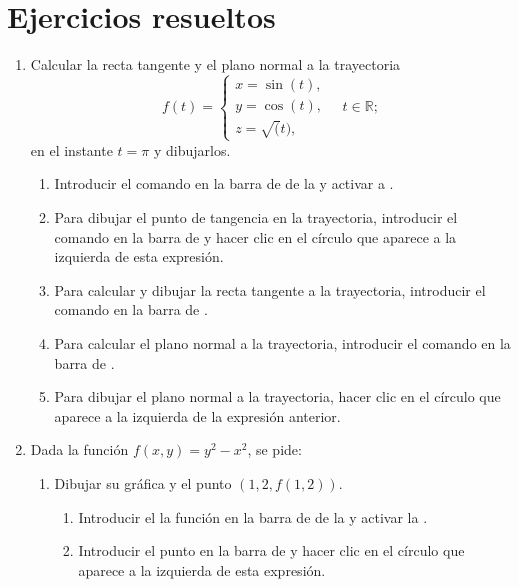 \section{Ejercicios resueltos}
\begin{enumerate}[leftmargin=*]
\item Calcular la recta tangente y el plano normal a la trayectoria
      \[
      f(t)=
      \begin{cases}
      x=\sin(t), \\
      y=\cos(t), \\
      z=\sqrt(t),
      \end{cases}
      \quad t\in \mathbb{R};
      \]
      en el instante $t=\pi$ y dibujarlos.

      \begin{indication}
      \begin{enumerate}
      \item Introducir el comando  en la barra de  de la  y activar a .
      \item Para dibujar el punto de tangencia en la trayectoria, introducir el comando  en la barra de  y hacer clic en el círculo que aparece a la izquierda de esta expresión.
      \item Para calcular y dibujar la recta tangente a la trayectoria, introducir el comando  en la barra de .
      \item Para calcular el plano normal a la trayectoria, introducir el comando  en la barra de .
      \item Para dibujar el plano normal a la trayectoria, hacer clic en el círculo que aparece a la izquierda de la expresión anterior.
      \end{enumerate}
      \end{indication}

\item Dada la función $f(x,y)=y^2-x^2$, se pide:
      \begin{enumerate}
      \item Dibujar su gráfica y el punto $(1,2,f(1,2))$.
            \begin{indication}
            \begin{enumerate}
            \item Introducir el la función  en la barra de  de la  y activar la .
            \item Introducir el punto  en la barra de  y hacer clic en el círculo que aparece a la izquierda de esta expresión.
            \end{enumerate}


\end{indication}
\end{enumerate}
\end{enumerate}
